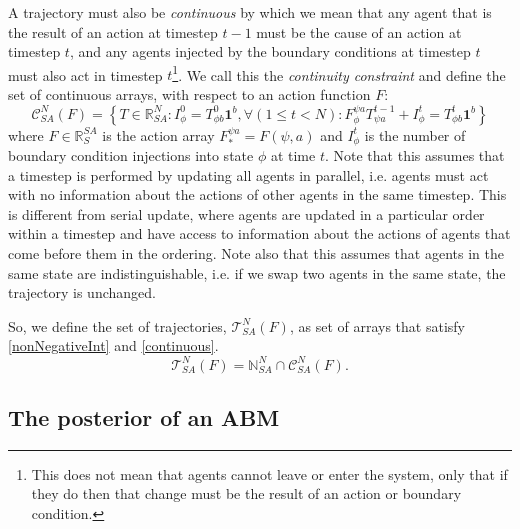 \documentclass{article}
\begin{document}
A trajectory must also be \textit{continuous} by which we mean that any agent that is the result of an action at timestep $t-1$ must be the cause of an action at timestep $t$, and any agents injected by the boundary conditions at timestep $t$ must also act in timestep $t$\footnote{This does not mean that agents cannot leave or enter the system, only that if they do then that change must be the result of an action or boundary condition.}. We call this the \textit{continuity constraint} and define the set of continuous arrays, with respect to an action function $F$:
\begin{equation}
\mathcal{C}^N_{SA}(F) = \left\{T\in\mathbb{R}^N_{SA}: I^0_\phi = T^{0}_{\phi b}\mathbf{1}^b, \forall \left(  1 \le t < N\right): F^{\psi a}_{\phi} T^{t-1}_{\psi a} + I^t_\phi = T^{t}_{\phi b}\mathbf{1}^b  \right\}
\label{continuous}
\end{equation}
where $F \in \mathbb{R}^{SA}_S$ is the action array $F^{\psi a}_* = F(\psi, a)$ and $I^t_\phi$ is the number of boundary condition injections into state $\phi$ at time $t$. Note that this assumes that a timestep is performed by updating all agents in parallel, i.e. agents must act with no information about the actions of other agents in the same timestep. This is different from serial update, where agents are updated in a particular order within a timestep and have access to information about the actions of agents that come before them in the ordering. Note also that this assumes that agents in the same state are indistinguishable, i.e. if we swap two agents in the same state, the trajectory is unchanged.


So, we define the set of trajectories, $\mathcal{T}^N_{SA}(F)$, as set of arrays that satisfy \eqref{nonNegativeInt} and \eqref{continuous}.
\begin{equation}
\mathcal{T}^N_{SA}(F) = \mathbb{N}^N_{SA} \cap \mathcal{C}^N_{SA}(F).
\label{SetOfTrajectories}
\end{equation}


\subsection{The posterior of an ABM}
\end{document}
